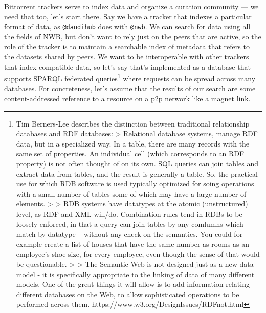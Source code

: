 \documentclass[10pt]{tufte-book}
\begin{document}
Bittorrent trackers serve to index data and organize a curation
community --- we need that too, let's start there. Say we have a tracker
that indexes a particular format of data, as
\href{https://hub.dandiarchive.org}{\texttt{@dandihub}} does with
\texttt{@nwb}. We can search for data using all the fields of NWB, but
don't want to rely just on the peers that are active, so the role of the
tracker is to maintain a searchable index of metadata that refers to the
datasets shared by peers. We want to be interoperable with other
trackers that index compatible data, so let's say that's implemented as
a database that supports
\href{https://www.w3.org/TR/sparql11-federated-query/}{SPARQL federated
queries}\footnote{Tim Berners-Lee describes the distinction between
  traditional relationship databases and RDF databases: \textgreater{}
  Relational database systems, manage RDF data, but in a specialized
  way. In a table, there are many records with the same set of
  properties. An individual cell (which corresponds to an RDF property)
  is not often thought of on its own. SQL queries can join tables and
  extract data from tables, and the result is generally a table. So, the
  practical use for which RDB software is used typically optimized for
  soing operations with a small number of tables some of which may have
  a large number of elements. \textgreater{} \textgreater{} RDB systems
  have datatypes at the atomic (unstructured) level, as RDF and XML
  will/do. Combination rules tend in RDBs to be loosely enforced, in
  that a query can join tables by any comlumns which match by datatype
  -- without any check on the semantics. You could for example create a
  list of houses that have the same number as rooms as an employee's
  shoe size, for every employee, even though the sense of that would be
  questionable. \textgreater{} \textgreater{} The Semantic Web is not
  designed just as a new data model - it is specifically appropriate to
  the linking of data of many different models. One of the great things
  it will allow is to add information relating different databases on
  the Web, to allow sophisticated operations to be performed across
  them. https://www.w3.org/DesignIssues/RDFnot.html} where requests can
be spread across many databases. For concreteness, let's assume that the
results of our search are some content-addressed reference to a resource
on a p2p network like a
\href{https://en.wikipedia.org/wiki/Magnet_URI_scheme}{magnet link}.
\end{document}
